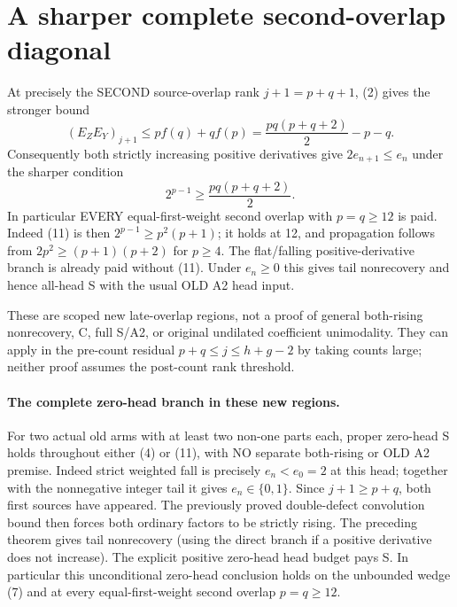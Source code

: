 \section{A sharper complete second-overlap diagonal}
At precisely the SECOND source-overlap rank $j+1=p+q+1$, (2)
gives the stronger bound
\[
 (E_ZE_Y)_{j+1}\le p f(q)+q f(p)
                   =\frac{pq(p+q+2)}2-p-q.           \tag{10}
\]
Consequently both strictly increasing positive derivatives give
$2e_{n+1}\le e_n$ under the sharper condition
\[
                       2^{p-1}\ge\frac{pq(p+q+2)}2.   \tag{11}
\]
In particular EVERY equal-first-weight second overlap with
$p=q\ge12$ is paid.  Indeed (11) is then
$2^{p-1}\ge p^2(p+1)$; it holds at 12, and propagation follows
from $2p^2\ge(p+1)(p+2)$ for $p\ge4$.
The flat/falling positive-derivative branch is already paid
without (11).  Under $e_n\ge0$ this gives tail nonrecovery
and hence all-head S with the usual OLD A2 head input.

These are scoped new late-overlap regions, not a proof of
general both-rising nonrecovery, C, full S/A2, or original
undilated coefficient unimodality.  They can apply in the
pre-count residual $p+q\le j\le h+g-2$ by taking counts large;
neither proof assumes the post-count rank threshold.

\paragraph{The complete zero-head branch in these new regions.}
For two actual old arms with at least two non-one parts each,
proper zero-head S holds throughout either (4) or (11), with
NO separate both-rising or OLD A2 premise.  Indeed strict weighted
fall is precisely $e_n<e_0=2$ at this head; together with the
nonnegative integer tail it gives $e_n\in\{0,1\}$.  Since
$j+1\ge p+q$, both first sources have appeared.  The previously
proved double-defect convolution bound then forces both ordinary
factors to be strictly rising.  The preceding theorem gives tail
nonrecovery (using the direct branch if a positive derivative
does not increase).  The explicit positive zero-head head budget
pays S.  In particular this unconditional zero-head conclusion
holds on the unbounded wedge (7) and at every equal-first-weight
second overlap $p=q\ge12$.

